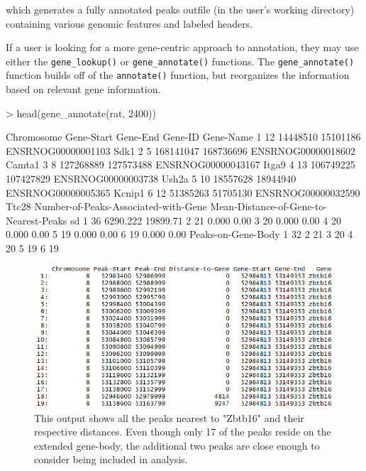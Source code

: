 \documentclass[12pt]{article}
\begin{document}
which generates a fully annotated peaks outfile (in the user's working directory) containing various genomic features and labeled headers.

If a user is looking for a more gene-centric approach to an\-notation, they may use either the \texttt{gene\_lookup()}
or \texttt{gene\_annotate()} functions. The \texttt{gene\_annotate()} function builds off of the \texttt{annotate()} function, but reorganizes the information based on relevant gene information.

\begin{Schunk}
\begin{Sinput}
> head(gene_annotate(rat, 2400))
\end{Sinput}
\begin{Soutput}
  Chromosome Gene-Start  Gene-End            Gene-ID Gene-Name
1         12   14448510  15101186 ENSRNOG00000001103      Sdk1
2          5  168141047 168736696 ENSRNOG00000018602    Camta1
3          8  127268889 127573488 ENSRNOG00000043167     Itga9
4         13  106749225 107427829 ENSRNOG00000003738     Ush2a
5         10   18557628  18944940 ENSRNOG00000005365    Kcnip1
6         12   51385263  51705130 ENSRNOG00000032590     Ttc28
  Number-of-Peaks-Associated-with-Gene Mean-Distance-of-Gene-to-Nearest-Peaks       sd
1                                   36                               6290.222 19899.71
2                                   21                                  0.000     0.00
3                                   20                                  0.000     0.00
4                                   20                                  0.000     0.00
5                                   19                                  0.000     0.00
6                                   19                                  0.000     0.00
  Peaks-on-Gene-Body
1                 32
2                 21
3                 20
4                 20
5                 19
6                 19
\end{Soutput}
\end{Schunk}

\begin{figure}[H]
\centering
\includegraphics{figures/vignette_gene_lookup_zbtb16_19.png}
\caption{This output shows all the peaks nearest to "Zbtb16" and their respective distances. Even though only 17 of the peaks reside on the extended gene-body, the additional two peaks are close enough to consider being included in analysis.}
\end{figure}
\end{document}
